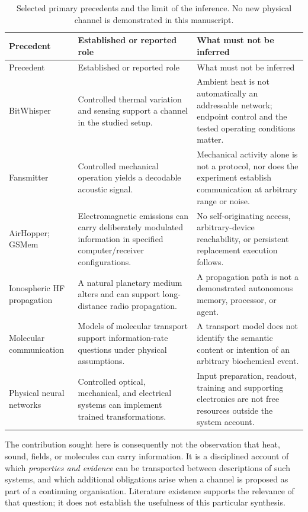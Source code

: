 \begin{longtable}{@{}>{\raggedright\arraybackslash}p{}>{\raggedright\arraybackslash}p{}>{\raggedright\arraybackslash}p{}@{}}
\caption{Selected primary precedents and the limit of the inference. No new physical channel is demonstrated in this manuscript.}\label{tab:priorart}\\
\toprule
Precedent & Established or reported role & What must not be inferred \\\midrule
\endfirsthead
\toprule Precedent & Established or reported role & What must not be inferred \\\midrule
\endhead
BitWhisper \citep{bitwhisper} & Controlled thermal variation and sensing support a channel in the studied setup. & Ambient heat is not automatically an addressable network; endpoint control and the tested operating conditions matter. \\\addlinespace
Fansmitter \citep{fansmitter} & Controlled mechanical operation yields a decodable acoustic signal. & Mechanical activity alone is not a protocol, nor does the experiment establish communication at arbitrary range or noise. \\\addlinespace
AirHopper; GSMem \citep{airhopper,gsmem} & Electromagnetic emissions can carry deliberately modulated information in specified computer/receiver configurations. & No self-originating access, arbitrary-device reachability, or persistent replacement execution follows. \\\addlinespace
Ionospheric HF propagation \citep{noaa} & A natural planetary medium alters and can support long-distance radio propagation. & A propagation path is not a demonstrated autonomous memory, processor, or agent. \\\addlinespace
Molecular communication \citep{eckford} & Models of molecular transport support information-rate questions under physical assumptions. & A transport model does not identify the semantic content or intention of an arbitrary biochemical event. \\\addlinespace
Physical neural networks \citep{wright} & Controlled optical, mechanical, and electrical systems can implement trained transformations. & Input preparation, readout, training and supporting electronics are not free resources outside the system account. \\
\bottomrule
\end{longtable}

The contribution sought here is consequently not the observation that heat, sound, fields, or molecules can carry information. It is a disciplined account of which \emph{properties and evidence} can be transported between descriptions of such systems, and which additional obligations arise when a channel is proposed as part of a continuing organisation. Literature existence supports the relevance of that question; it does not establish the usefulness of this particular synthesis.


